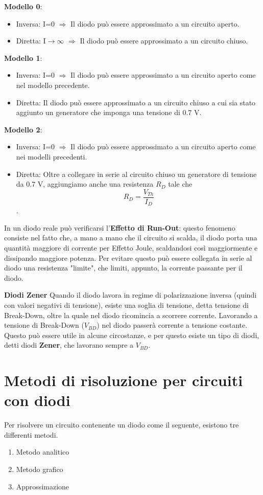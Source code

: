 \documentclass[\main/main.tex]{subfiles}
\begin{document}
\textbf{Modello 0}:
\begin{itemize}
  \item Inversa: I=0  $\Rightarrow$ Il diodo può essere approssimato a un circuito aperto.
  \item Diretta: I$\rightarrow\infty$  $\Rightarrow$ Il diodo può essere approssimato a un circuito chiuso.
\end{itemize}
\textbf{Modello 1}:
\begin{itemize}
  \item Inversa:  I=0  $\Rightarrow$  Il diodo può essere approssimato a un circuito aperto come nel modello precedente.
  \item Diretta: Il diodo può essere approssimato a un circuito chiuso a cui sia stato aggiunto un generatore che imponga una tensione di 0.7 V.
\end{itemize}
\textbf{Modello 2}:
\begin{itemize}
  \item Inversa: I=0  $\Rightarrow$ Il diodo può essere approssimato a un circuito aperto come nei modelli precedenti.
  \item Diretta: Oltre a collegare in serie al circuito chiuso un generatore di tensione da 0.7 V, aggiungiamo anche una resistenza $R_D$ tale che \[R_D = \frac{V_{Th}}{I_D}\].
\end{itemize}

In un diodo reale può verificarsi l'\textbf{Effetto di Run-Out}: questo fenomeno consiste nel fatto che, a mano a mano che il circuito si scalda, il diodo porta una quantità maggiore di corrente per Effetto Joule, scaldandosi così maggiormente e dissipando maggiore potenza. Per evitare questo può essere collegata in serie al diodo una resistenza "limite", che limiti, appunto, la corrente passante per il diodo.


\textbf{Diodi Zener}
Quando il diodo lavora in regime di polarizzazione inversa (quindi con valori negativi di tensione), esiste una soglia di tensione, detta tensione di Break-Down, oltre la quale nel diodo ricomincia a scorrere corrente.
Lavorando a tensione di Break-Down ($V_{BD}$) nel diodo passerà corrente a tensione costante. Questo può essere utile in alcune circostanze, e per questo esiste un tipo di diodi, detti diodi \textbf{Zener}, che lavorano sempre a $V_{BD}$.


\section{Metodi di risoluzione per circuiti con diodi}
Per risolvere un circuito contenente un diodo come il seguente, esistono tre differenti metodi.
\begin{enumerate}
  \item Metodo analitico
  \item Metodo grafico
  \item Approssimazione
\end{enumerate}
\end{document}
